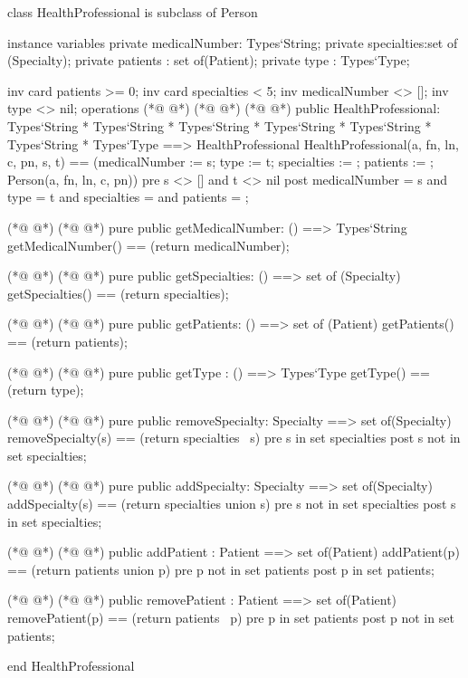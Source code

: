 \begin{vdmpp}[breaklines=true]
class HealthProfessional is subclass of Person

instance variables
  private medicalNumber: Types`String;
  private specialties:set of (Specialty);
  private patients : set of(Patient);
 private type : Types`Type;
 
 inv card patients >= 0;
  inv card specialties < 5;
 inv medicalNumber <> [];
 inv type <> nil;
operations
(*@
\label{MedicalAssociated:14}
@*)
(*@
\label{HealthProfessional:14}
@*)
(*@
\label{MedicalAssociated:14}
@*)
 public HealthProfessional: Types`String * Types`String * Types`String * Types`String * Types`String * Types`String * Types`Type ==> HealthProfessional
  HealthProfessional(a, fn, ln, c, pn, s, t) == (medicalNumber := s; type := t; specialties := {}; patients := {}; Person(a, fn, ln, c, pn))
 pre s <> [] and t <> nil
 post medicalNumber = s and type = t and specialties = {} and patients = {};
 
(*@
\label{getMedicalNumber:19}
@*)
(*@
\label{getMedicalNumber:19}
@*)
 pure public getMedicalNumber: () ==> Types`String
  getMedicalNumber() == (return medicalNumber);
 
(*@
\label{getSpecialties:22}
@*)
(*@
\label{getSpecialties:22}
@*)
 pure public getSpecialties: () ==> set of (Specialty)
  getSpecialties() == (return specialties);
 
(*@
\label{getPatients:25}
@*)
(*@
\label{getPatients:25}
@*)
 pure public getPatients: () ==> set of (Patient)
  getPatients() == (return patients);
  
(*@
\label{getType:28}
@*)
(*@
\label{getType:28}
@*)
 pure public getType : () ==> Types`Type
  getType() == (return type);
  
(*@
\label{removeSpecialty:31}
@*)
(*@
\label{removeSpecialty:31}
@*)
 pure public removeSpecialty: Specialty ==> set of(Specialty)
  removeSpecialty(s) == (return specialties \ {s})
 pre s in set specialties
 post s not in set specialties;
  
(*@
\label{addSpecialty:36}
@*)
(*@
\label{addSpecialty:36}
@*)
 pure public addSpecialty: Specialty ==> set of(Specialty)
  addSpecialty(s) == (return specialties union {s})
 pre s not in set specialties
 post s in set specialties;
 
(*@
\label{addPatient:41}
@*)
(*@
\label{addPatient:41}
@*)
 public addPatient : Patient ==> set of(Patient)
  addPatient(p) == (return patients union {p})
 pre p not in set patients
 post p in set patients;
 
(*@
\label{removePatient:46}
@*)
(*@
\label{removePatient:46}
@*)
 public removePatient : Patient ==> set of(Patient)
  removePatient(p) == (return patients \ {p})
 pre p in set patients
 post p not in set patients;

end HealthProfessional
\end{vdmpp}
